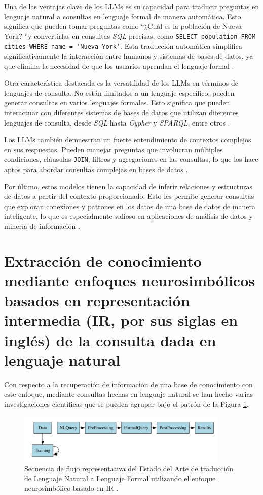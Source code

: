 Una de las ventajas clave de los LLMs es su capacidad para traducir preguntas en lenguaje natural a consultas en lenguaje formal de manera automática. Esto significa que pueden tomar preguntas como \textquotedblleft ¿Cuál es la población de Nueva York? \textquotedblright y convertirlas en consultas \textit{SQL} precisas, como \texttt{SELECT population FROM cities WHERE name = 'Nueva York'}. Esta traducción automática simplifica significativamente la interacción entre humanos y sistemas de bases de datos, ya que elimina la necesidad de que los usuarios aprendan el lenguaje formal \cite{mehrietal2019}.

Otra característica destacada es la versatilidad de los LLMs en términos de lenguajes de consulta. No están limitados a un lenguaje específico; pueden generar consultas en varios lenguajes formales. Esto significa que pueden interactuar con diferentes sistemas de bases de datos que utilizan diferentes lenguajes de consulta, desde \textit{SQL} hasta \textit{Cypher} y \textit{SPARQL}, entre otros \cite{llmsoverview}.

Los LLMs también demuestran un fuerte entendimiento de contextos complejos en sus respuestas. Pueden manejar preguntas que involucran múltiples condiciones, cláusulas \texttt{JOIN}, filtros y agregaciones en las consultas, lo que los hace aptos para abordar consultas complejas en bases de datos \cite{mehrietal2019}.

Por último, estos modelos tienen la capacidad de inferir relaciones y estructuras de datos a partir del contexto proporcionado. Esto les permite generar consultas que exploran conexiones y patrones en los datos de una base de datos de manera inteligente, lo que es especialmente valioso en aplicaciones de análisis de datos y minería de información \cite{llmsoverview}.

\section{Extracción de conocimiento mediante enfoques neurosimbólicos basados en representación intermedia (IR, por sus siglas en inglés) de la consulta dada en lenguaje natural} \label{neurosymbolic_approach}

Con respecto a la recuperación de información de una base de conocimiento con este enfoque, mediante consultas hechas en lenguaje natural se han hecho varias investigaciones científicas que se pueden agrupar bajo el patrón de la Figura \ref{neurosym_approach}.

\begin{figure}[!h]\label{neurosym_approach}
	\centering
	\includegraphics[width = 0.9\textwidth]{./Graphics/neurosym_approach}
	\caption{Secuencia de flujo representativa del Estado del Arte de traducción de
Lenguaje Natural a Lenguaje Formal utilizando el enfoque neurosimbólico basado en IR \cite{omarthesis2022}.}
\end{figure}

